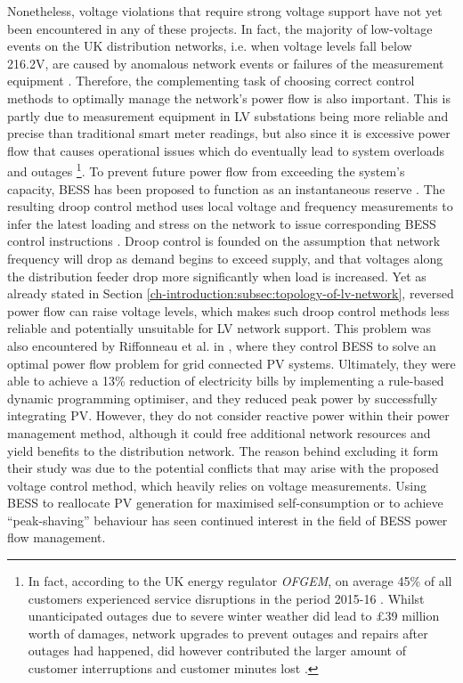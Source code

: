 Nonetheless, voltage violations that require strong voltage support have not yet been encountered in any of these projects.
In fact, the majority of low-voltage events on the UK distribution networks, i.e. when voltage levels fall below 216.2V, are caused by anomalous network events or failures of the measurement equipment \cite{UKPowerNetworks2014a}.
Therefore, the complementing task of choosing correct control methods to optimally manage the network's power flow is also important.
This is partly due to measurement equipment in LV substations being more reliable and precise than traditional smart meter readings, but also since it is excessive power flow that causes operational issues which do eventually lead to system overloads and outages \footnote[1]{In fact, according to the UK energy regulator \textit{OFGEM}, on average 45\% of all customers experienced service disruptions in the period 2015-16 \cite{Ofgem2017}. Whilst unanticipated outages due to severe winter weather did lead to \pounds39 million worth of damages, network upgrades to prevent outages and repairs after outages had happened, did however contributed the larger amount of customer interruptions and customer minutes lost \cite{Ofgem2014}.}\cite{Putrus2009, Pillai2010}.
To prevent future power flow from exceeding the system's capacity, BESS has been proposed to function as an instantaneous reserve \cite{Kunisch1986a, Kunisch1986}.
The resulting droop control method uses local voltage and frequency measurements to infer the latest loading and stress on the network to issue corresponding BESS control instructions \cite{Engler2005a}.
Droop control is founded on the assumption that network frequency will drop as demand begins to exceed supply, and that voltages along the distribution feeder drop more significantly when load is increased.
Yet as already stated in Section \ref{ch-introduction:subsec:topology-of-lv-network}, reversed power flow can raise voltage levels, which makes such droop control methods less reliable and potentially unsuitable for LV network support.
This problem was also encountered by Riffonneau et al. in \cite{Riffonneau2011}, where they control BESS to solve an optimal power flow problem for grid connected PV systems.
Ultimately, they were able to achieve a 13\% reduction of electricity bills by implementing a rule-based dynamic programming optimiser, and they reduced peak power by successfully integrating PV.
However, they do not consider reactive power within their power management method, although it could free additional network resources and yield benefits to the distribution network.
The reason behind excluding it form their study was due to the potential conflicts that may arise with the proposed voltage control method, which heavily relies on voltage measurements.
Using BESS to reallocate PV generation for maximised self-consumption \cite{SaniHassan2017} or to achieve ``peak-shaving'' behaviour \cite{Bennett2015, DePaola2016} has seen continued interest in the field of BESS power flow management.

